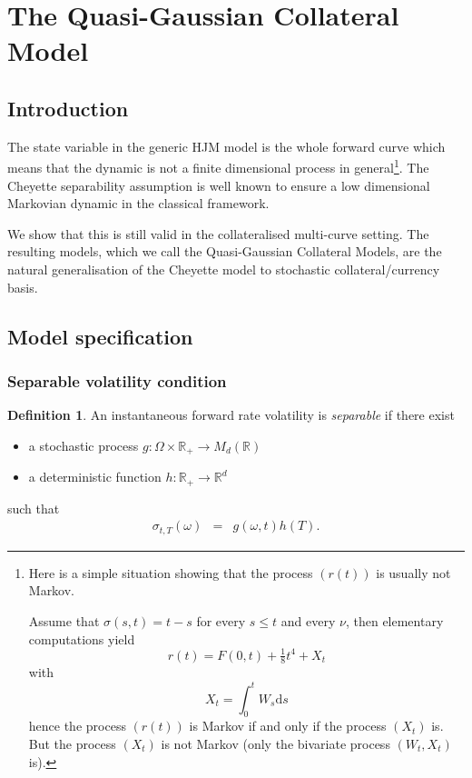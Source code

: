 \documentclass[11pt,english]{amsart}
\newcommand{\RR}{\mathbb{R}}
\theoremstyle{definition}
\newtheorem{defi}{Definition}
\begin{document}
\newpage%
\section{The Quasi-Gaussian Collateral Model}


\setcounter{subsection}{-1}
\subsection{Introduction}
The state variable in the generic HJM model is the whole forward curve which means that the dynamic is not a finite dimensional process in general\footnote{Here is a simple situation showing that the process $(r(t))$ is usually not Markov.

Assume that $\sigma(s,t)=t-s$ for every $s\leqslant t$ and every $\nu$, then elementary computations yield $$r(t)=F(0,t)+\tfrac18t^4+X_t$$ with $$X_t=\int_0^tW_s\mathrm ds$$ hence  the process $(r(t))$ is Markov if and only if the process $(X_t)$ is. But the process $(X_t)$ is not Markov (only the bivariate process $(W_t,X_t)$ is).}. The Cheyette separability assumption is well known to ensure a low dimensional Markovian dynamic in the classical framework. 


We show that this is still valid in the collateralised multi-curve setting. The resulting models, which we call the Quasi-Gaussian Collateral Models, are the natural generalisation of the Cheyette model to stochastic collateral/currency basis.


\subsection{Model specification}


\subsubsection{Separable volatility condition}%


\begin{defi}
An instantaneous forward rate volatility is \emph{separable} if there exist 
\begin{itemize} 
\item a stochastic process $g : \Omega \times \RR_+ \to M_d(\RR)$ 
\item a deterministic function $h : \RR_+ \to \RR^d$ 
\end{itemize}
such that 
\begin{eqnarray}
  \sigma_{t,T}(\omega)  &=& g(\omega,t)h(T).
  \label{eq:separability_condition}
\end{eqnarray}
\end{defi}
\end{document}
